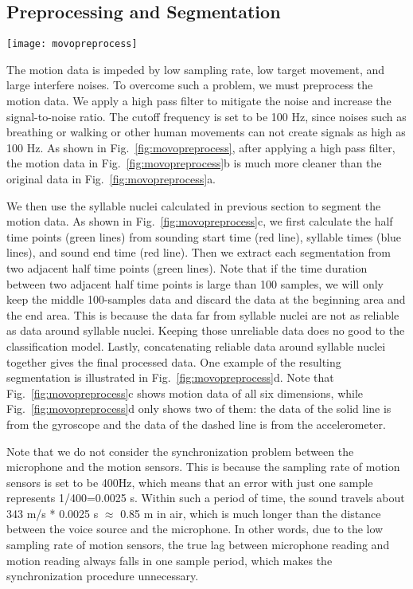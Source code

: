 %
\subsection{Preprocessing and Segmentation}
\begin{figure*}[h]
	\centering
	\texttt{[image: movopreprocess]}
	\caption{Preprocessing and Segmentation. }
	\label{fig:movopreprocess}
\end{figure*}
The motion data is impeded by low sampling rate, low target movement, and large interfere noises. To overcome such a problem, we must preprocess the motion data. We apply a high pass filter to mitigate the noise and increase the signal-to-noise ratio. The cutoff frequency is set to be 100 Hz, since noises such as breathing or walking or other human movements can not create signals as high as 100 Hz. As shown in Fig.~\ref{fig:movopreprocess}, after applying a high pass filter, the motion data in Fig.~\ref{fig:movopreprocess}b is much more cleaner than the original data in Fig.~\ref{fig:movopreprocess}a. 

We then use the syllable nuclei calculated in previous section to segment the motion data. As shown in Fig.~\ref{fig:movopreprocess}c, we first calculate the half time points (green lines) from sounding start time (red line), syllable times (blue lines), and sound end time (red line). Then we extract each segmentation from two adjacent half time points (green lines). Note that if the time duration between two adjacent half time points is large than 100 samples,  we will only keep the middle 100-samples data and discard the data at the beginning area and the end area. This is because the data far from syllable nuclei are not as reliable as data around syllable nuclei. Keeping those unreliable data does no good to the classification model.
%
Lastly, concatenating reliable data around syllable nuclei together gives the final processed data. One example of the resulting segmentation is illustrated in Fig.~\ref{fig:movopreprocess}d. Note that Fig.~\ref{fig:movopreprocess}c shows motion data of all six dimensions, while Fig.~\ref{fig:movopreprocess}d only shows two of them: the data of the solid line is  from the gyroscope and the data of the dashed line is from the accelerometer.

Note that we do not consider the synchronization problem between the microphone and the motion sensors. This is because the sampling rate of motion sensors is set to be 400Hz, which means that an error with just one sample represents 1/400=0.0025 s. Within such a period of time, the sound travels about 343 m/s * 0.0025 s $\approx$ 0.85 m  in air, which is much longer than the distance between the voice source and the microphone. In other words, due to the low sampling rate of motion sensors, the true lag between microphone reading and motion reading always falls in one sample period, which makes the synchronization procedure unnecessary. 


